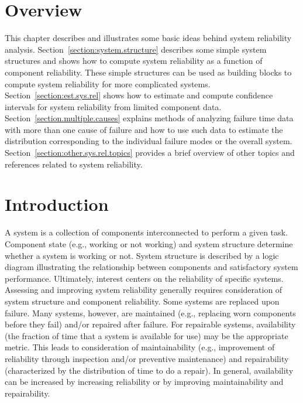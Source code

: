 \section*{Overview}
This chapter describes and illustrates some basic ideas behind system
reliability analysis.  Section~\ref{section:system.structure} describes some
simple system structures and shows how to compute system reliability as a
function of component reliability. These simple structures can be used
as building blocks to compute system reliability for more complicated
systems. Section~\ref{section:est.sys.rel} shows how to estimate and
compute confidence intervals for system reliability from limited
component data. Section~\ref{section.multiple.causes} explains
methods of analyzing failure time data with more than one cause of
failure and how to use such data to estimate the distribution
corresponding to the individual failure modes or the overall system.
Section~\ref{section:other.sys.rel.topics} provides a brief overview
of other topics and references related to system reliability.

\section{Introduction}

A system is a collection of components interconnected to
perform a given task.  Component state (e.g., working or not working)
and system structure determine whether a system is working or not.
System structure is described by a logic diagram illustrating the
relationship between components and satisfactory system performance.
Ultimately, interest centers on the reliability of specific systems.
Assessing and improving system reliability generally requires
consideration of system structure and component reliability. Some
systems are replaced upon failure.  Many systems, however, are
maintained (e.g., replacing worn components before they fail) and/or
repaired after failure.  For repairable systems, availability (the
fraction of time that a system is available for use) may be the
appropriate metric.  This leads to consideration of maintainability
(e.g., improvement of reliability through inspection and/or preventive
maintenance) and repairability (characterized by the distribution of time
to do a repair).  In general, availability can be increased by
increasing reliability or by improving maintainability and
repairability.

